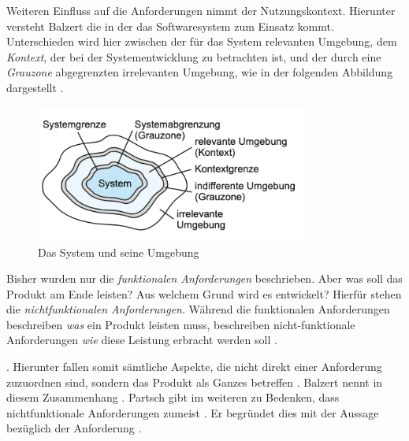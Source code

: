 Weiteren Einfluss auf die Anforderungen nimmt der Nutzungskontext. Hierunter versteht Balzert die  \citep[][461]{Balzert2010} in der das Softwaresystem zum Einsatz kommt. 
Unterschieden wird hier zwischen der für das System relevanten Umgebung, dem \textit{Kontext}, der bei der Systementwicklung zu betrachten ist, und der durch eine \textit{Grauzone} abgegrenzten irrelevanten Umgebung, wie in der folgenden Abbildung dargestellt \citep[vgl.][462]{Balzert2010}.

\begin{figure}[h]
  \centering
  \includegraphics[width=0.8\textwidth]{res/Anforderung1.png}
  \caption{Das System und seine Umgebung \citep[][462]{Balzert2010}}
  \label{fig:Systemumgebung}
\end{figure}

Bisher wurden nur die \textit{funktionalen Anforderungen} beschrieben. Aber was soll das Produkt am Ende leisten? Aus welchem Grund wird es entwickelt? Hierfür stehen die \textit{nichtfunktionalen Anforderungen}. 
Während die funktionalen Anforderungen beschreiben \textit{was} ein Produkt leisten muss, beschreiben nicht-funktionale Anforderungen \textit{wie} diese Leistung erbracht werden soll \citep[vgl.][30]{Partsch2010}.

 \citep[][S. 27 f.]{Partsch2010}.
Hierunter fallen somit sämtliche Aspekte, die nicht direkt einer Anforderung zuzuordnen sind, sondern das Produkt als Ganzes betreffen \citep[vgl.][463]{Balzert2010}. 
Balzert nennt in diesem Zusammenhang  \citep[][463]{Balzert2010}. 
Partsch gibt im weiteren zu Bedenken, dass nichtfunktionale Anforderungen zumeist  \citep[][30]{Partsch2010}. Er begründet dies mit der Aussage bezüglich der Anforderung  \citep[][30]{Partsch2010}.




